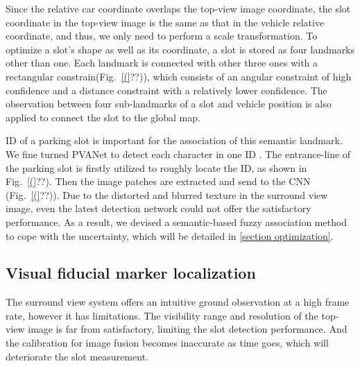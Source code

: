 \documentclass[journal]{IEEEtran}
\newcommand{\Reffig}[1]{Fig.~\ref{#1}}
\begin{document}
Since the relative car coordinate overlaps the top-view image coordinate, the slot coordinate in the top-view image is the same as that in the vehicle relative coordinate, and thus, we only need to perform a scale transformation.
%
To optimize a slot's shape as well as its coordinate, a slot is stored as four landmarks other than one.
Each landmark is connected with other three ones with a rectangular constrain(\Reffig(??)), which consists of an angular constraint of high confidence and a distance constraint with a relatively lower confidence.
The observation between four sub-landmarks of a slot and vehicle position is also applied to connect the slot to the global map.

%

ID of a parking slot is important for the association of this semantic landmark.
We fine turned PVANet to detect each character in one ID \citep{Hong2016PVANet}.
The entrance-line of the parking slot is firstly utilized to roughly locate the ID, as shown in \Reffig(??).
Then the image patches are extracted and send to the CNN (\Reffig(??)).
Due to the distorted and blurred texture in the surround view image, even the latest detection network could not offer the satisfactory performance.
As a result, we devised a semantic-based fuzzy association method to cope with the uncertainty, which will be detailed in \ref{section optimization}.  





\subsection{Visual fiducial marker localization}

The surround view system offers an intuitive ground observation at a high frame rate, however it has limitations. 
The visibility range and resolution of the top-view image is far from satisfactory, limiting the slot detection performance. 
And the calibration for image fusion becomes inaccurate as time goes, which will deteriorate the slot measurement.
\end{document}
